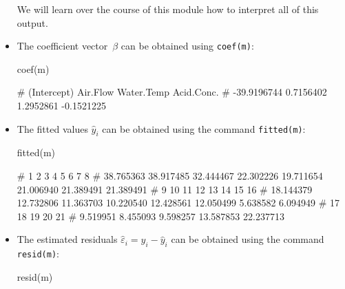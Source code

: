 \documentclass[
  a4paper,
]{article}
\newenvironment{Shaded}{\begin{snugshade}}{\end{snugshade}}
\newcommand{\FunctionTok}[1]{\textcolor[rgb]{0.00,0.00,0.00}{#1}}
\newcommand{\NormalTok}[1]{#1}
\theoremstyle{definition}
\theoremstyle{definition}
\theoremstyle{definition}
\theoremstyle{definition}
\theoremstyle{remark}
\begin{document}
\begin{itemize}
  We will learn over the course of this module how to interpret
  all of this output.
\item
  The coefficient vector~\(\beta\) can be obtained using
  \texttt{coef(m)}:

\begin{Shaded}
\begin{Highlighting}[]
  \FunctionTok{coef}\NormalTok{(m)}
\end{Highlighting}
\end{Shaded}

\begin{Shaded}
\begin{Highlighting}[]
\NormalTok{\# (Intercept)    Air.Flow  Water.Temp  Acid.Conc. }
\NormalTok{\# {-}39.9196744   0.7156402   1.2952861  {-}0.1521225}
\end{Highlighting}
\end{Shaded}
\item
  The fitted values \(\hat y_i\) can be obtained using
  the command \texttt{fitted(m)}:

\begin{Shaded}
\begin{Highlighting}[]
  \FunctionTok{fitted}\NormalTok{(m)}
\end{Highlighting}
\end{Shaded}

\begin{Shaded}
\begin{Highlighting}[]
\NormalTok{\#         1         2         3         4         5         6         7         8 }
\NormalTok{\# 38.765363 38.917485 32.444467 22.302226 19.711654 21.006940 21.389491 21.389491 }
\NormalTok{\#         9        10        11        12        13        14        15        16 }
\NormalTok{\# 18.144379 12.732806 11.363703 10.220540 12.428561 12.050499  5.638582  6.094949 }
\NormalTok{\#        17        18        19        20        21 }
\NormalTok{\#  9.519951  8.455093  9.598257 13.587853 22.237713}
\end{Highlighting}
\end{Shaded}
\item
  The estimated residuals \(\hat\varepsilon_i = y_i - \hat y_i\) can
  be obtained using the command \texttt{resid(m)}:

\begin{Shaded}
\begin{Highlighting}[]
  \FunctionTok{resid}\NormalTok{(m)}
\end{Highlighting}
\end{Shaded}


\end{itemize}
\end{document}
